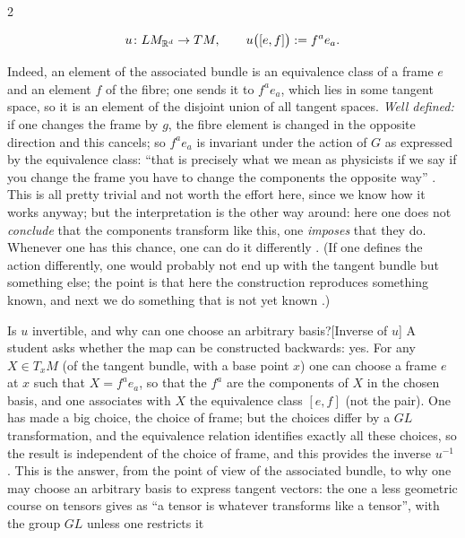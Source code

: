 \begin{paracol}{2}
\begin{proposition}
\[
  u\colon LM_{\mathbb{R}^d}\to TM,\qquad u\bigl([e,f]\bigr):=f^ae_a .
\]
       
\end{proposition}
Indeed, an element of the associated bundle is an equivalence class of a frame $e$ and an element $f$ of the fibre; one sends it to $f^ae_a$, which lies in some tangent space, so it is an element of the disjoint union of all tangent spaces. \emph{Well defined:} if one changes the frame by $g$, the fibre element is changed in the opposite direction and this cancels; so $f^ae_a$ is invariant under the action of $G$ as expressed by the equivalence class: ``that is precisely what we mean as physicists if we say if you change the frame you have to change the components the opposite way''   . This is all pretty trivial and not worth the effort here, since we know how it works anyway; but the interpretation is the other way around: here one does not \emph{conclude} that the components transform like this, one \emph{imposes} that they do. Whenever one has this chance, one can do it differently  . (If one defines the action differently, one would probably not end up with the tangent bundle but something else; the point is that here the construction reproduces something known, and next we do something that is not yet known .)
\begin{answer}{Is $u$ invertible, and why can one choose an arbitrary basis?}[Inverse of $u$]
A student asks whether the map can be constructed backwards: yes. For any $X\in T_xM$ (of the tangent bundle, with a base point $x$) one can choose a frame $e$ at $x$ such that $X=f^ae_a$, so that the $f^a$ are the components of $X$ in the chosen basis, and one associates with $X$ the equivalence class $[e,f]$ (not the pair). One has made a big choice, the choice of frame; but the choices differ by a $GL$ transformation, and the equivalence relation identifies exactly all these choices, so the result is independent of the choice of frame, and this provides the inverse $u^{-1}$          . This is the answer, from the point of view of the associated bundle, to why one may choose an arbitrary basis to express tangent vectors: the one a less geometric course on tensors gives as ``a tensor is whatever transforms like a tensor'', with the group $GL$ unless one restricts it   

\end{answer}
\end{paracol}
